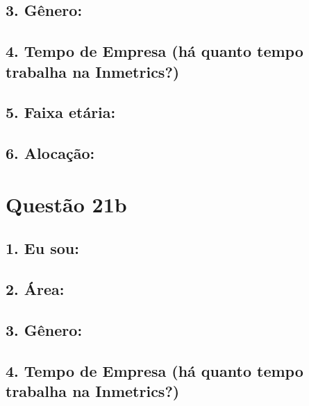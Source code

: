 \documentclass[]{book}
\begin{document}
\hypertarget{genero-61}{%
\subsection{3. Gênero:}\label{genero-61}}

\hypertarget{tempo-de-empresa-ha-quanto-tempo-trabalha-na-inmetrics-61}{%
\subsection{4. Tempo de Empresa (há quanto tempo trabalha na Inmetrics?)}\label{tempo-de-empresa-ha-quanto-tempo-trabalha-na-inmetrics-61}}

\hypertarget{faixa-etaria-61}{%
\subsection{5. Faixa etária:}\label{faixa-etaria-61}}

\hypertarget{alocacao-61}{%
\subsection{6. Alocação:}\label{alocacao-61}}

\hypertarget{questao-21b}{%
\section{Questão 21b}\label{questao-21b}}

\hypertarget{eu-sou-62}{%
\subsection{1. Eu sou:}\label{eu-sou-62}}

\hypertarget{area-62}{%
\subsection{2. Área:}\label{area-62}}

\hypertarget{genero-62}{%
\subsection{3. Gênero:}\label{genero-62}}

\hypertarget{tempo-de-empresa-ha-quanto-tempo-trabalha-na-inmetrics-62}{%
\subsection{4. Tempo de Empresa (há quanto tempo trabalha na Inmetrics?)}\label{tempo-de-empresa-ha-quanto-tempo-trabalha-na-inmetrics-62}}
\end{document}
